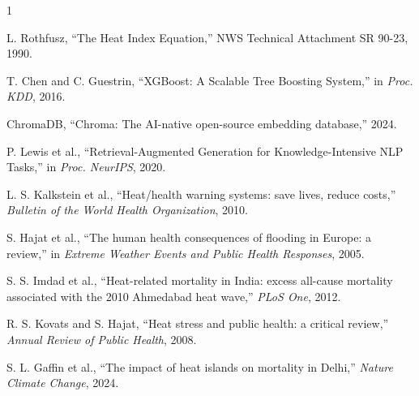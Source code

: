 \documentclass[conference]{IEEEtran}
\begin{document}

\begin{thebibliography}{1}

 L. Rothfusz, ``The Heat Index Equation,'' NWS Technical Attachment SR 90-23, 1990.

 T. Chen and C. Guestrin, ``XGBoost: A Scalable Tree Boosting System,'' in \textit{Proc. KDD}, 2016.

 ChromaDB, ``Chroma: The AI-native open-source embedding database,'' 2024.

 P. Lewis et al., ``Retrieval-Augmented Generation for Knowledge-Intensive NLP Tasks,'' in \textit{Proc. NeurIPS}, 2020.

 L. S. Kalkstein et al., ``Heat/health warning systems: save lives, reduce costs,'' \textit{Bulletin of the World Health Organization}, 2010.

 S. Hajat et al., ``The human health consequences of flooding in Europe: a review,'' in \textit{Extreme Weather Events and Public Health Responses}, 2005.

 S. S. Imdad et al., ``Heat-related mortality in India: excess all-cause mortality associated with the 2010 Ahmedabad heat wave,'' \textit{PLoS One}, 2012.

 R. S. Kovats and S. Hajat, ``Heat stress and public health: a critical review,'' \textit{Annual Review of Public Health}, 2008.

 S. L. Gaffin et al., ``The impact of heat islands on mortality in Delhi,'' \textit{Nature Climate Change}, 2024.

\end{thebibliography}
\end{document}
